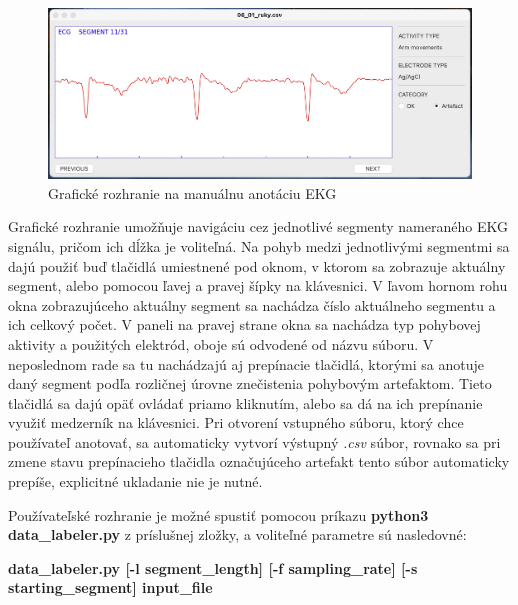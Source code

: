\begin{figure}[H]
    \centering
    \includegraphics[scale=0.225]{img/annotation_sw.jpeg}
    \caption{Grafické rozhranie na manuálnu anotáciu EKG}
    \label{fig:SW_labels}
\end{figure}

Grafické rozhranie umožňuje navigáciu cez jednotlivé segmenty nameraného EKG signálu, pričom ich dĺžka je voliteľná. Na pohyb medzi jednotlivými segmentmi sa dajú použiť buď tlačidlá umiestnené pod oknom, v ktorom sa zobrazuje aktuálny segment, alebo pomocou ľavej a pravej šípky na klávesnici. V ľavom hornom rohu okna zobrazujúceho aktuálny segment sa nachádza číslo aktuálneho segmentu a ich celkový počet. V paneli na pravej strane okna sa nachádza typ pohybovej aktivity a použitých elektród, oboje sú odvodené od názvu súboru. V neposlednom rade sa tu nachádzajú aj prepínacie tlačidlá, ktorými sa anotuje daný segment podľa rozličnej úrovne znečistenia pohybovým artefaktom. Tieto tlačidlá sa dajú opäť ovládať priamo kliknutím, alebo sa dá na ich prepínanie využiť medzerník na klávesnici. Pri otvorení vstupného súboru, ktorý chce používateľ anotovať, sa automaticky vytvorí výstupný \textit{.csv} súbor, rovnako sa pri zmene stavu prepínacieho tlačidla označujúceho artefakt tento súbor automaticky prepíše, explicitné ukladanie nie je nutné. 

Používateľské rozhranie je možné spustiť pomocou príkazu \textbf{python3 data\_labeler.py} z príslušnej zložky, a voliteľné parametre sú nasledovné:

 \noindent \textbf{data\_labeler.py [-l segment\_length] [-f sampling\_rate] [-s starting\_segment] input\_file}
 
